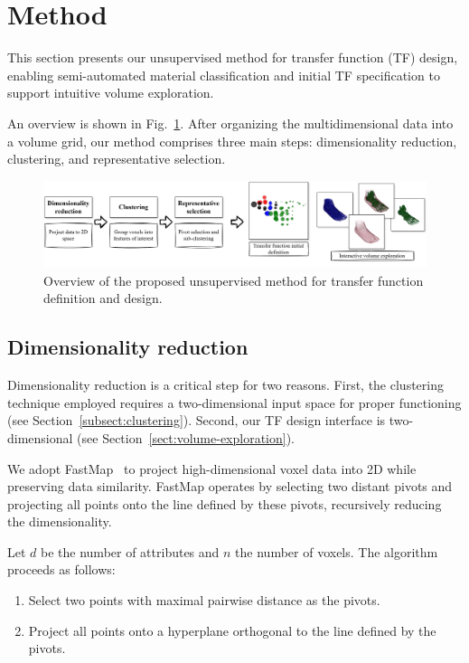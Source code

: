 \section{Method}
\label{sect:method}

This section presents our unsupervised method for transfer function (TF) design, enabling semi-automated material classification and initial TF specification to support intuitive volume exploration.

An overview is shown in Fig.~\ref{fig:volume-exploration-pipeline}. After organizing the multidimensional data into a volume grid, our method comprises three main steps: dimensionality reduction, clustering, and representative selection.

\begin{figure}[htb!]
    \centering
    \caption{Overview of the proposed unsupervised method for transfer function definition and design.}
    \label{fig:volume-exploration-pipeline}
    \includegraphics[width=\textwidth]{figs/method-overview.jpg}
\end{figure}

\subsection{Dimensionality reduction}
\label{subsect:feature-extraction}

Dimensionality reduction is a critical step for two reasons. First, the clustering technique employed requires a two-dimensional input space for proper functioning (see Section~\ref{subsect:clustering}). Second, our TF design interface is two-dimensional (see Section~\ref{sect:volume-exploration}).

We adopt FastMap~\cite{faloutsos1995} to project high-dimensional voxel data into 2D while preserving data similarity. FastMap operates by selecting two distant pivots and projecting all points onto the line defined by these pivots, recursively reducing the dimensionality.

Let $d$ be the number of attributes and $n$ the number of voxels. The algorithm proceeds as follows:

\begin{enumerate}
    \item Select two points with maximal pairwise distance as the pivots.
    \item Project all points onto a hyperplane orthogonal to the line defined by the pivots.
\end{enumerate}

